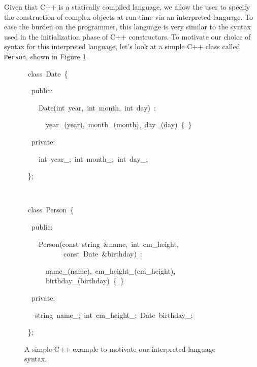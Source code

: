 \documentclass[a4paper]{article}
\newenvironment{lyxcode}
{\par\begin{list}{}{
\scriptsize
\setlength{\leftmargin}{0.1in}
\setlength{\rightmargin}{\leftmargin}
\setlength{\listparindent}{0pt}%
\raggedright
\setlength{\itemsep}{0pt}
\setlength{\parsep}{0pt}
\normalfont\ttfamily}%
 \item[]}
{\end{list}}
\begin{document}
Given that C++ is a statically compiled language, we allow the user to specify
the construction of complex objects at run-time via an interpreted language. To
ease the burden on the programmer, this language is very similar to the syntax
used in the initialization phase of C++ constructors. To motivate our choice of
syntax for this interpreted language, let's look at a simple C++ class called
\texttt{Person}, shown in Figure \ref{fig:cpp-person-example}. 
\begin{figure}
\begin{lyxcode}

~class~Date~\{

~~public:

~~~~Date(int~year,~int~month,~int~day)~:

~~~~~~year\_(year),~month\_(month),~day\_(day)~\{~\}

~~private:

~~~~int~year\_;~int~month\_;~int~day\_;

~\};

\


~class~Person~\{

~~public:

~~~~Person(const~string~\&name,~int~cm\_height,\\

~~~~~~~~~~~const~Date~\&birthday)~:

~~~~~~name\_(name),~cm\_height\_(cm\_height),\\

~~~~~~birthday\_(birthday)~\{~\}

~~private:

~~~string~name\_;~int~cm\_height\_;~Date~birthday\_;

~\};
\end{lyxcode}
\vspace{-0.2in}
\caption{\label{fig:cpp-person-example}A simple C++ example to motivate our
interpreted language syntax.}
\end{figure}
\end{document}
